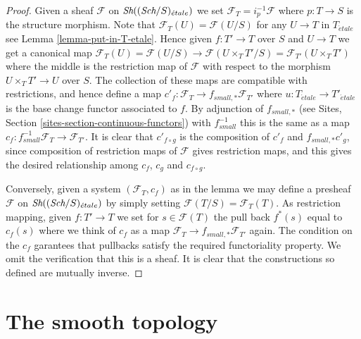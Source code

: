 \begin{proof}
Given a sheaf $\mathcal{F}$ on $\mathop{\textit{Sh}}\nolimits((\textit{Sch}/S)_{\acute{e}tale})$
we set $\mathcal{F}_T = i_p^{-1}\mathcal{F}$ where $p : T \to S$
is the structure morphism. Note that
$\mathcal{F}_T(U) = \mathcal{F}(U/S)$ for any $U \to T$
in $T_{\acute{e}tale}$ see Lemma \ref{lemma-put-in-T-etale}.
Hence given $f : T' \to T$ over $S$ and $U \to T$ we get a canonical
map $\mathcal{F}_T(U) = \mathcal{F}(U/S) \to \mathcal{F}(U \times_T T'/S)
= \mathcal{F}_{T'}(U \times_T T')$ where the middle is the restriction map
of $\mathcal{F}$ with respect to the morphism
$U \times_T T' \to U$ over $S$. The collection of these maps are
compatible with restrictions, and hence define a map
$c'_f : \mathcal{F}_T \to f_{small, *}\mathcal{F}_{T'}$ where
$u : T_{\acute{e}tale} \to T'_{\acute{e}tale}$ is the base change functor
associated to $f$. By adjunction of $f_{small, *}$ (see
Sites, Section \ref{sites-section-continuous-functors}) with
$f_{small}^{-1}$ this is the same as a map
$c_f : f_{small}^{-1}\mathcal{F}_T \to \mathcal{F}_{T'}$.
It is clear that $c'_{f \circ g}$ is the composition of
$c'_f$ and $f_{small, *}c'_g$, since composition of restriction maps
of $\mathcal{F}$ gives restriction maps, and this gives the desired
relationship among $c_f$, $c_g$ and $c_{f \circ g}$.

\medskip\noindent
Conversely, given a system $(\mathcal{F}_T, c_f)$ as in the lemma
we may define a presheaf $\mathcal{F}$ on
$\mathop{\textit{Sh}}\nolimits((\textit{Sch}/S)_{\acute{e}tale})$
by simply setting $\mathcal{F}(T/S) = \mathcal{F}_T(T)$. As restriction
mapping, given $f : T' \to T$ we set for $s \in \mathcal{F}(T)$
the pull back $f^*(s)$ equal to $c_f(s)$ where we think of $c_f$ as
a map $\mathcal{F}_T \to f_{small, *}\mathcal{F}_{T'}$ again.
The condition on the $c_f$ garantees that
pullbacks satisfy the required functoriality property.
We omit the verification that this is a sheaf.
It is clear that the constructions so defined are mutually inverse.
\end{proof}























\section{The smooth topology}
\label{section-smooth}

